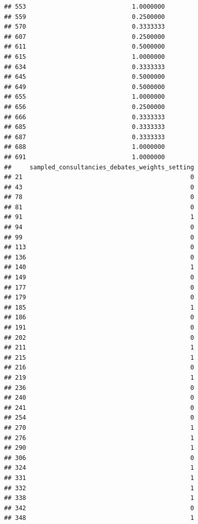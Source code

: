 \documentclass[
]{article}
\begin{document}
\begin{verbatim}
## 553                             1.0000000
## 559                             0.2500000
## 570                             0.3333333
## 607                             0.2500000
## 611                             0.5000000
## 615                             1.0000000
## 634                             0.3333333
## 645                             0.5000000
## 649                             0.5000000
## 655                             1.0000000
## 656                             0.2500000
## 666                             0.3333333
## 685                             0.3333333
## 687                             0.3333333
## 688                             1.0000000
## 691                             1.0000000
##     sampled_consultancies_debates_weights_setting
## 21                                              0
## 43                                              0
## 78                                              0
## 81                                              0
## 91                                              1
## 94                                              0
## 99                                              0
## 113                                             0
## 136                                             0
## 140                                             1
## 149                                             0
## 177                                             0
## 179                                             0
## 185                                             1
## 186                                             0
## 191                                             0
## 202                                             0
## 211                                             1
## 215                                             1
## 216                                             0
## 219                                             1
## 236                                             0
## 240                                             0
## 241                                             0
## 254                                             0
## 270                                             1
## 276                                             1
## 290                                             1
## 306                                             0
## 324                                             1
## 331                                             1
## 332                                             1
## 338                                             1
## 342                                             0
## 348                                             1

\end{verbatim}
\end{document}
